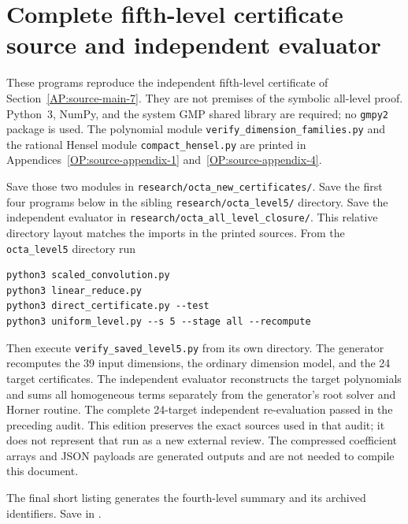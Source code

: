 \documentclass[11pt,a4paper]{article}
\theoremstyle{definition}\newtheorem{definition}[theorem]{Definition}
\theoremstyle{remark}\newtheorem{remark}[theorem]{Remark}
\numberwithin{equation}{section}
\begin{document}
\clearpage
\section{Complete fifth-level certificate source and independent evaluator}
\label{app:level5-programs}
These programs reproduce the independent fifth-level certificate of
Section~\ref{AP:source-main-7}. They are not premises of the symbolic
all-level proof. Python~3, NumPy, and the system GMP shared library are
required; no \texttt{gmpy2} package is used. The polynomial module
\texttt{verify\_dimension\_families.py} and the rational Hensel module
\texttt{compact\_hensel.py} are printed in
Appendices~\ref{OP:source-appendix-1} and~\ref{OP:source-appendix-4}.

Save those two modules in \texttt{research/octa\_new\_certificates/}.
Save the first four programs below in the sibling
\texttt{research/octa\_level5/} directory. Save the independent evaluator
in \texttt{research/octa\_all\_level\_closure/}. This relative directory
layout matches the imports in the printed sources. From the
\texttt{octa\_level5} directory run
\begin{verbatim}
python3 scaled_convolution.py
python3 linear_reduce.py
python3 direct_certificate.py --test
python3 uniform_level.py --s 5 --stage all --recompute
\end{verbatim}
Then execute \texttt{verify\_saved\_level5.py} from its own directory.
The generator recomputes the 39 input dimensions, the ordinary
dimension model, and the 24 target certificates. The independent
evaluator reconstructs the target polynomials and sums all homogeneous
terms separately from the generator's root solver and Horner routine.
The complete 24-target independent re-evaluation passed in the
preceding audit. This edition preserves the exact sources used in
that audit; it does not represent that run as a new external review.
The compressed coefficient arrays and JSON payloads are generated
outputs and are not needed to compile this document.

The final short listing generates the fourth-level summary and its
archived identifiers. Save  in
.
\end{document}
